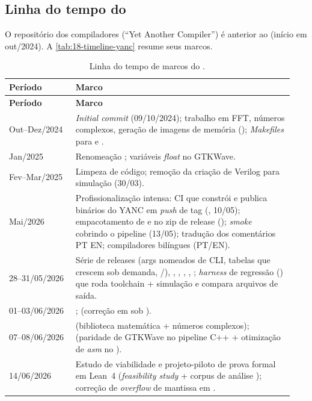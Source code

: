 \subsection{Linha do tempo do }
\label{sub:18-timeline-yanc}

O repositório dos compiladores (\enquote{Yet Another Compiler}) é anterior ao
 (início em out/2024). A \autoref{tab:18-timeline-yanc} resume seus
marcos.

\begin{longtable}{P{0.22\linewidth} Q{0.72\linewidth}}
  \caption{Linha do tempo de marcos do .}
  \label{tab:18-timeline-yanc}\\
  \toprule
  \textbf{Período} & \textbf{Marco} \\
  \midrule
  \endfirsthead
  \toprule
  \textbf{Período} & \textbf{Marco} \\
  \midrule
  \endhead
  \bottomrule
  \endfoot
  Out--Dez/2024 & \emph{Initial commit} (09/10/2024); trabalho em FFT, números complexos, geração de imagens de memória (); \emph{Makefiles} para  e . \\
  Jan/2025 & Renomeação  \textrightarrow{} ; variáveis \emph{float} no GTKWave. \\
  Fev--Mar/2025 & Limpeza de código; remoção da criação de Verilog para simulação (30/03). \\
  Mai/2026 & Profissionalização intensa: CI que constrói e publica binários do YANC em \emph{push} de tag (, 10/05); empacotamento de  e  no zip de release (); \emph{smoke} cobrindo o pipeline  \textrightarrow{}  \textrightarrow{}  (13/05); tradução dos comentários PT \textrightarrow{} EN; compiladores bilíngues (PT/EN). \\
  28--31/05/2026 & Série de releases  (args nomeados de CLI, tabelas que crescem sob demanda, /), , , , , ; \emph{harness} de regressão () que roda toolchain + simulação e compara arquivos de saída. \\
  01--03/06/2026 & ;  (correção em  sob ). \\
  07--08/06/2026 &  (biblioteca matemática + números complexos);  (paridade de GTKWave no pipeline C++ + otimização de \emph{asm} no ). \\
  14/06/2026 & Estudo de viabilidade e projeto-piloto de prova formal em Lean~4 (\emph{feasibility study} + corpus de análise ); correção de \emph{overflow} de mantissa em . \\
  \bottomrule
\end{longtable}

